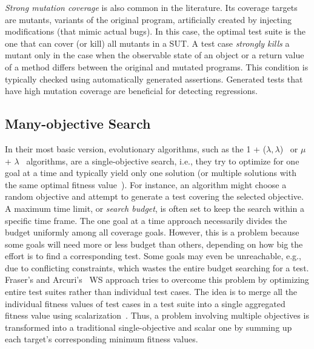 \documentclass[paper=a4,%
  twoside,%
  BCOR4mm,%
  abstract=true,%
  toc=bibliography,%
  chapterprefix=true,%
  toc=bibliographynumbered,%
  open=right,%
  english,%
  pagesize=pdftex]{scrreprt}
\begin{document}
\emph{Strong mutation coverage} is also common in the literature. Its coverage targets are mutants, variants of the original program, artificially created by injecting modifications (that mimic actual bugs). In this case, the optimal test suite is the one that can cover (or kill) all mutants in a \ac{SUT}. A test case \emph{strongly kills} a mutant only in the case when the observable state of an object or a return value of a method differs between the original and mutated programs. This condition is typically checked using automatically generated assertions. Generated tests that have high mutation coverage are beneficial for detecting regressions.


\subsection{Many-objective Search}
In their most basic version, evolutionary algorithms, such as the 1 + ($\lambda,\lambda$)~\cite{Doerr2015} or $\mu$ + $\lambda$~\cite{TerSarkisov2011} algorithms, are a single-objective search, i.e., they try to optimize for one goal at a time and typically yield only one solution (or multiple solutions with the same optimal fitness value~\cite{Panichella2018}). For instance, an algorithm might choose a random objective and attempt to generate a test covering the selected objective. A maximum time limit, or \emph{search budget}, is often set to keep the search within a specific time frame. The one goal at a time approach necessarily divides the budget uniformly among all coverage goals. However, this is a problem because some goals will need more or less budget than others, depending on how big the effort is to find a corresponding test. Some goals may even be unreachable, e.g., due to conflicting constraints, which wastes the entire budget searching for a test. Fraser's and Arcuri's~\cite{Fraser_2013} \ac{WS} approach tries to overcome this problem by optimizing entire test suites rather than individual test cases. The idea is to merge all the individual fitness values of test cases in a test suite into a single aggregated fitness value using scalarization~\cite{Deb2014}. Thus, a problem involving multiple objectives is transformed into a traditional single-objective and scalar one by summing up each target's corresponding minimum fitness values. 
\end{document}
